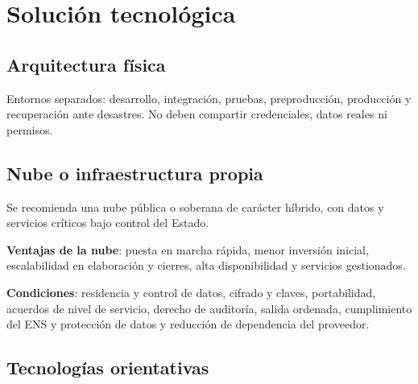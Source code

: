 \documentclass[11pt,a4paper]{article}
\begin{document}
\section{Solución tecnológica}

\subsection{Arquitectura física}

\begin{center}
\end{center}

Entornos separados: desarrollo, integración, pruebas, preproducción, producción y recuperación ante desastres. No deben compartir credenciales, datos reales ni permisos.

\subsection{Nube o infraestructura propia}

Se recomienda una nube pública o soberana de carácter híbrido, con datos y servicios críticos bajo control del Estado.

\textbf{Ventajas de la nube}: puesta en marcha rápida, menor inversión inicial, escalabilidad en elaboración y cierres, alta disponibilidad y servicios gestionados.

\textbf{Condiciones}: residencia y control de datos, cifrado y claves, portabilidad, acuerdos de nivel de servicio, derecho de auditoría, salida ordenada, cumplimiento del ENS y protección de datos y reducción de dependencia del proveedor.

\subsection{Tecnologías orientativas}
\end{document}
